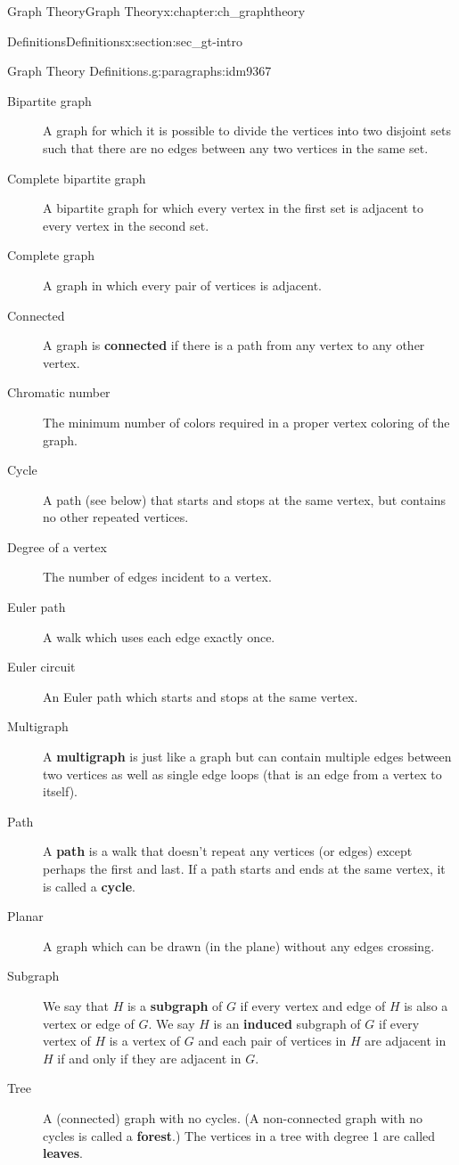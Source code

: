 \documentclass[oneside,10pt,]{book}
\newcommand{\terminology}[1]{\textbf{#1}}
\numberwithin{equation}{chapter}
\begin{document}
\begin{chapterptx}{Graph Theory}{}{Graph Theory}{}{}{x:chapter:ch_graphtheory}
\begin{sectionptx}{Definitions}{}{Definitions}{}{}{x:section:sec_gt-intro}
\begin{paragraphs}{Graph Theory Definitions.}{g:paragraphs:idm9367}
\begin{description}
\item[{Bipartite graph}] A graph for which it is possible to divide the vertices into two disjoint sets such that there are no edges between any two vertices in the same set.%
\item[{Complete bipartite graph}]A bipartite graph for which every vertex in the first set is adjacent to every vertex in the second set.%
\item[{Complete graph}] A graph in which every pair of vertices is adjacent.%
\item[{Connected}] A graph is \terminology{connected} if there is a path from any vertex to any other vertex.%
\item[{Chromatic number}] The minimum number of colors required in a proper vertex coloring of the graph.%
\item[{Cycle}] A path (see below) that starts and stops at the same vertex, but contains no other repeated vertices.%
\item[{Degree of a vertex}] The number of edges incident to a vertex.%
\item[{Euler path}]A walk which uses each edge exactly once.%
\item[{Euler circuit}] An Euler path which starts and stops at the same vertex.%
\item[{Multigraph}] A \terminology{multigraph} is just like a graph but can contain multiple edges between two vertices as well as single edge loops (that is an edge from a vertex to itself).%
\item[{Path}]A \terminology{path} is a walk that doesn't repeat any vertices (or edges) except perhaps the first and last.  If a path starts and ends at the same vertex, it is called a \terminology{cycle}.%
\item[{Planar}] A graph which can be drawn (in the plane) without any edges crossing.%
\item[{Subgraph}] We say that \(H\) is a \terminology{subgraph} of \(G\) if every vertex and edge of \(H\) is also a vertex or edge of \(G\). We say \(H\) is an \terminology{induced} subgraph of \(G\) if every vertex of \(H\) is a vertex of \(G\) and each pair of vertices in \(H\) are adjacent in \(H\) if and only if they are adjacent in \(G\).%
\item[{Tree}] A (connected) graph with no cycles. (A non-connected graph with no cycles is called a \terminology{forest}.) The vertices in a tree with degree 1 are called \terminology{leaves}.%

\end{description}
\end{paragraphs}
\end{sectionptx}
\end{chapterptx}
\end{document}
